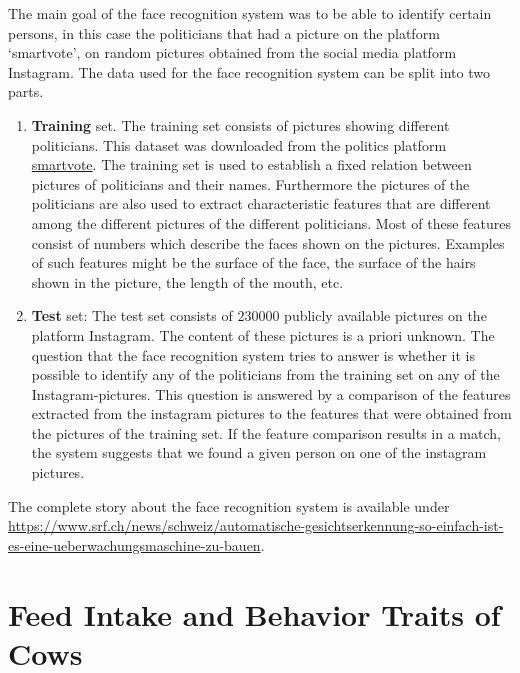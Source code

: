 \documentclass[
]{book}
\providecommand{\tightlist}{%
  \setlength{\itemsep}{0pt}\setlength{\parskip}{0pt}}
\theoremstyle{definition}
\theoremstyle{definition}
\theoremstyle{definition}
\theoremstyle{remark}
\begin{document}
The main goal of the face recognition system was to be able to identify certain persons, in this case the politicians that had a picture on the platform `smartvote', on random pictures obtained from the social media platform Instagram. The data used for the face recognition system can be split into two parts.

\begin{enumerate}
\def\labelenumi{\arabic{enumi}.}
\tightlist
\item
  \textbf{Training} set. The training set consists of pictures showing different politicians. This dataset was downloaded from the politics platform \href{https://smartvote.ch/}{smartvote}. The training set is used to establish a fixed relation between pictures of politicians and their names. Furthermore the pictures of the politicians are also used to extract characteristic features that are different among the different pictures of the different politicians. Most of these features consist of numbers which describe the faces shown on the pictures. Examples of such features might be the surface of the face, the surface of the hairs shown in the picture, the length of the mouth, etc.\\
\item
  \textbf{Test} set: The test set consists of \(230000\) publicly available pictures on the platform Instagram. The content of these pictures is a priori unknown. The question that the face recognition system tries to answer is whether it is possible to identify any of the politicians from the training set on any of the Instagram-pictures. This question is answered by a comparison of the features extracted from the instagram pictures to the features that were obtained from the pictures of the training set. If the feature comparison results in a match, the system suggests that we found a given person on one of the instagram pictures.
\end{enumerate}

The complete story about the face recognition system is available under \url{https://www.srf.ch/news/schweiz/automatische-gesichtserkennung-so-einfach-ist-es-eine-ueberwachungsmaschine-zu-bauen}.

\hypertarget{feed-intake-and-behavior-traits-of-cows}{%
\section{Feed Intake and Behavior Traits of Cows}\label{feed-intake-and-behavior-traits-of-cows}}
\end{document}
